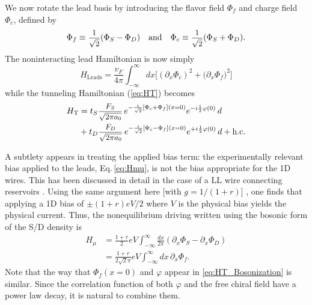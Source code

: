 \documentclass[aps,prb,reprint,floatfix,superscriptaddress,amssymb,amsmath]{revtex4-2}
\newcommand{\sdfrac}[2]{\mbox{\small$\displaystyle\frac{#1}{#2}$}}
\begin{document}
We now rotate the lead basis by introducing the flavor field $\Phi_{f}$ and charge field $\Phi_{c}$, defined by 
\begin{equation}
\Phi_{f} \equiv \sdfrac{1}{\sqrt{2}} (\Phi_{S}-\Phi_{D}) \quad\text{and}\quad
\Phi_{c} \equiv \sdfrac{1}{\sqrt{2}} (\Phi_{S}+\Phi_{D}).
\label{eq:CF_field}
\end{equation}
The noninteracting lead Hamiltonian is now simply
\begin{equation}
H_{\text{Leads}}=\frac{v_{F}}{4\pi}\int_{-\infty}^{\infty}dx \big[\left(\partial_{x}\Phi_{c}\right)^{2}+\big(\partial_{x}\Phi_{f}\big)^{2}\big]
\end{equation}
while the tunneling Hamiltonian (\ref{eq:HT}) becomes
\begin{equation}
\begin{aligned}
H_{\textrm{T}} &  =   t_{S}\sdfrac{F_{S}}{\sqrt{2\pi a_0}}\,
e^{-\frac{i}{\sqrt{2}}[\Phi_c+\Phi_f](x=0)} e^{-i\frac{1}{2}\varphi(0) } \,d \\ 
   & + t_{D}\sdfrac{F_{D}}{\sqrt{2\pi a_0}}\,e^{-\frac{i}{\sqrt{2}}[\Phi_c-\Phi_f](x=0)}
e^{+i\frac{1}{2}\varphi(0) } \,d
+ \text{h.c.}  
\end{aligned}
\label{eq:HT_Bosonization}
\end{equation}

A subtlety appears in treating the applied bias term: the experimentally relevant bias applied to the leads, Eq.\,\eqref{eq:Hmu}, is not the bias appropriate for the 1D wires. This has been discussed in detail in the case of a LL wire connecting reservoirs \cite{PonomarenkoRPB95, SafiSchulzPRB95, MaslovStonePRB95, FrohlichPRB96, HuKaneX16}. 
Using the same argument here [with $g\!=\!1/(1+r)$] \cite{AppC-HuKaneX16}, 
one finds that applying a 1D bias of $\pm (1+r)eV/2$ where $V$ is the physical bias yields the physical current. 
Thus, the nonequilibrium driving written using the bosonic form of the S/D density is
\begin{equation}
\begin{aligned}
H_\mu &= \frac{1+r}{2} eV \int_{-\infty}^{\infty} \!\frac{dx}{2\pi}  
\left(\partial_x \Phi_S - \partial_x \Phi_D \right) \\
& = \frac{1+r}{2\sqrt{2}\pi}eV \int_{-\infty}^{\infty} \!\!dx\, \partial_x \Phi_f.
\end{aligned}
\label{eq:bias_hamiltonian}
\end{equation}
Note that the way that $\Phi_{f}(x\!=\!0)$ and $\varphi$ appear in \eqref{eq:HT_Bosonization} is similar. Since the correlation function of both $\varphi$ and the free chiral field have a power law decay, it is natural to combine them.
\end{document}
